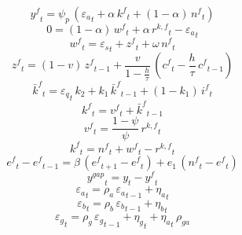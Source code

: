 \begin{dmath}
{{y^{f}}}_{t}={{\psi_p}}\, \left({{\varepsilon_a}}_{t}+{{\alpha}}\, {{k^{f}}}_{t}+\left(1-{{\alpha}}\right)\, {{n^{f}}}_{t}\right)
\end{dmath}
\begin{dmath}
0=\left(1-{{\alpha}}\right)\, {{w^{f}}}_{t}+{{\alpha}}\, {{r^{k,f}}}_{t}-{{\varepsilon_a}}_{t}
\end{dmath}
\begin{dmath}
{{w^{f}}}_{t}={{\varepsilon_s}}_{t}+{{z^{f}}}_{t}+{{\omega}}\, {{n^{f}}}_{t}
\end{dmath}
\begin{dmath}
{{z^{f}}}_{t}=\left(1-{{v}}\right)\, {{z^{f}}}_{t-1}+\frac{{{v}}}{1-\frac{{{h}}}{{{\tau}}}}\, \left({{c^{f}}}_{t}-\frac{{{h}}}{{{\tau}}}\, {{c^{f}}}_{t-1}\right)
\end{dmath}
\begin{dmath}
{{\bar{k}^{f}}}_{t}={{\varepsilon_q}}_{t}\, {{k_2}}+{{k_1}}\, {{\bar{k}^{f}}}_{t-1}+\left(1-{{k_1}}\right)\, {{i^{f}}}_{t}
\end{dmath}
\begin{dmath}
{{k^{f}}}_{t}={{v^{f}}}_{t}+{{\bar{k}^{f}}}_{t-1}
\end{dmath}
\begin{dmath}
{{v^{f}}}_{t}=\frac{1-{{\psi}}}{{{\psi}}}\, {{r^{k,f}}}_{t}
\end{dmath}
\begin{dmath}
{{k^{f}}}_{t}={{n^{f}}}_{t}+{{w^{f}}}_{t}-{{r^{k,f}}}_{t}
\end{dmath}
\begin{dmath}
{{e^{f}}}_{t}-{{e^{f}}}_{t-1}={{\beta}}\, \left({{e^{f}}}_{t+1}-{{e^{f}}}_{t}\right)+{{e_1}}\, \left({{n^{f}}}_{t}-{{e^{f}}}_{t}\right)
\end{dmath}
\begin{dmath}
{{y^{gap}}}_{t}={{y}}_{t}-{{y^{f}}}_{t}
\end{dmath}
\begin{dmath}
{{\varepsilon_a}}_{t}={{\rho_a}}\, {{\varepsilon_a}}_{t-1}+{{\eta_a}}_{t}
\end{dmath}
\begin{dmath}
{{\varepsilon_b}}_{t}={{\rho_b}}\, {{\varepsilon_b}}_{t-1}+{{\eta_b}}_{t}
\end{dmath}
\begin{dmath}
{{\varepsilon_g}}_{t}={{\rho_g}}\, {{\varepsilon_g}}_{t-1}+{{\eta_g}}_{t}+{{\eta_a}}_{t}\, {{\rho_{ga}}}
\end{dmath}
